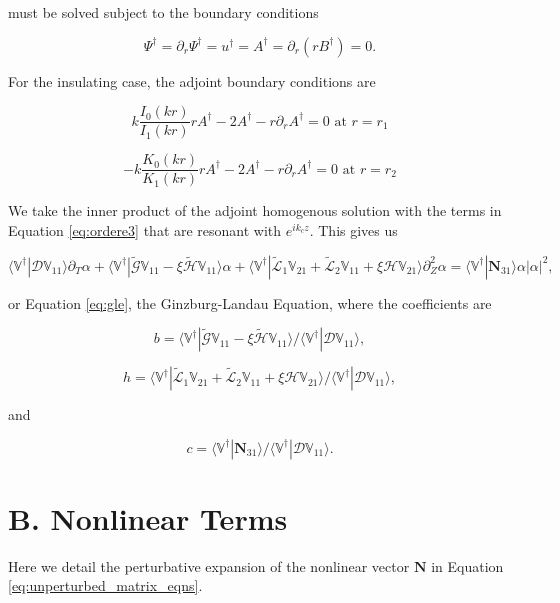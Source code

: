 \documentclass{emulateapj}
\newcommand{\beq}{\begin{equation}}
\newcommand{\eeq}{\end{equation}}
\begin{document}
must be solved subject to the boundary conditions

\beq
\Psi^\dagger = \partial_r \Psi^\dagger = u^\dagger = A^\dagger = \partial_r (r B^\dagger) = 0.
\eeq

For the insulating case, the adjoint boundary conditions are

\beq
k \frac{I_0 (k r)}{I_1 (k r)} r A^\dagger - 2 A^\dagger - r \partial_r A^\dagger = 0 \, \, \mathrm{at} \, \,   r = r_1
\eeq

\beq
- k \frac{K_0 (k r)}{K_1 (k r)} r A^\dagger - 2 A^\dagger - r \partial_r A^\dagger = 0 \, \, \mathrm{at} \, \,   r = r_2
\eeq

We take the inner product of the adjoint homogenous solution with the terms in Equation \ref{eq:ordere3} that are resonant with $e^{i k_c z}$. This gives us

\beq
\langle \mathbb{V}^\dagger | \mathcal{D} \mathbb{V}_{11} \rangle \partial_T \alpha + \langle  \mathbb{V}^\dagger | \widetilde{\mathcal{G}} \mathbb{V}_{11} - \xi \widetilde{\mathcal{H}} \mathbb{V}_{11} \rangle \alpha +  \langle \mathbb{V}^\dagger | \widetilde{\mathcal{L}}_1 \mathbb{V}_{21} + \widetilde{\mathcal{L}}_2 \mathbb{V}_{11} + \xi \mathcal{H} \mathbb{V}_{21} \rangle \partial_Z^2 \alpha = \langle \mathbb{V}^\dagger | \mathbf{N}_{31} \rangle \alpha |\alpha|^2,
\eeq

or Equation \ref{eq:gle}, the Ginzburg-Landau Equation, where the coefficients are 

\beq
b = \langle  \mathbb{V}^\dagger | \widetilde{\mathcal{G}} \mathbb{V}_{11} - \xi \widetilde{\mathcal{H}} \mathbb{V}_{11} \rangle / \langle \mathbb{V}^\dagger | \mathcal{D} \mathbb{V}_{11} \rangle,
\eeq

\beq
h = \langle \mathbb{V}^\dagger | \widetilde{\mathcal{L}}_1 \mathbb{V}_{21} + \widetilde{\mathcal{L}}_2 \mathbb{V}_{11} + \xi \mathcal{H} \mathbb{V}_{21} \rangle / \langle \mathbb{V}^\dagger | \mathcal{D} \mathbb{V}_{11} \rangle,
\eeq

and

\beq
c = \langle \mathbb{V}^\dagger | \mathbf{N}_{31} \rangle / \langle \mathbb{V}^\dagger | \mathcal{D} \mathbb{V}_{11} \rangle. 
\eeq

\section{B. Nonlinear Terms}\label{app:nonlinear_terms}

Here we detail the perturbative expansion of the nonlinear vector $\mathbf{N}$ in Equation \ref{eq:unperturbed_matrix_eqns}. 
\end{document}
